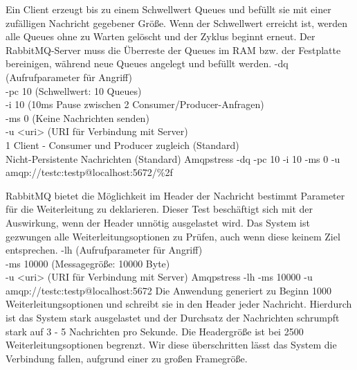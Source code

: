 \documentclass[	a4paper,
			11pt,
			titlepage,
			oneside,
			fleqn,
			listof=totoc,
			parskip,
			chapterprefix=false,
			numbers=noenddot]{scrreprt}
\begin{document}
\clearpage
		{Ein Client erzeugt bis zu einem Schwellwert Queues und befüllt sie mit einer zufälligen Nachricht gegebener Größe. Wenn der Schwellwert erreicht ist, werden alle Queues ohne zu Warten gelöscht und der Zyklus beginnt erneut. Der RabbitMQ-Server muss die Überreste der Queues im RAM bzw. der Festplatte bereinigen, während neue Queues angelegt und befüllt werden.}%
		{%
		 -dq (Aufrufparameter für Angriff) \\
		 -pc 10 (Schwellwert: 10 Queues) \\
		 -i 10 (10ms Pause zwischen 2 Consumer/Producer-Anfragen) \\
		 -ms 0 (Keine Nachrichten senden) \\
		 -u <uri> (URI für Verbindung mit Server) \\
		 1 Client - Consumer und Producer zugleich (Standard) \\
		 Nicht-Persistente Nachrichten (Standard)
		}%
		{Amqpstress -dq -pc 10 -i 10 -ms 0  -u amqp://testc:testp@localhost:5672/\%2f}%
		{}

\clearpage
		{RabbitMQ bietet die Möglichkeit im Header der Nachricht bestimmt Parameter für die Weiterleitung zu deklarieren. Dieser Test beschäftigt sich mit der Auswirkung, wenn der Header unnötig ausgelastet wird. Das System ist gezwungen alle Weiterleitungsoptionen zu Prüfen, auch wenn diese keinem Ziel entsprechen.}%
		{%
		 -lh (Aufrufparameter für Angriff) \\
		 -ms 10000 (Messagegröße: 10000 Byte) \\
		 -u <uri> (URI für Verbindung mit Server)
		}%
		{Amqpstress -lh -ms 10000 -u amqp://testc:testp@localhost:5672}%
		{Die Anwendung generiert zu Beginn 1000 Weiterleitungsoptionen und schreibt sie in den Header jeder Nachricht. Hierdurch ist das System stark ausgelastet und der Durchsatz der Nachrichten schrumpft stark auf 3 - 5 Nachrichten pro Sekunde.}
		{Die Headergröße ist bei 2500 Weiterleitungsoptionen begrenzt. Wir diese überschritten lässt das System die Verbindung fallen, aufgrund einer zu großen Framegröße.}
\end{document}

